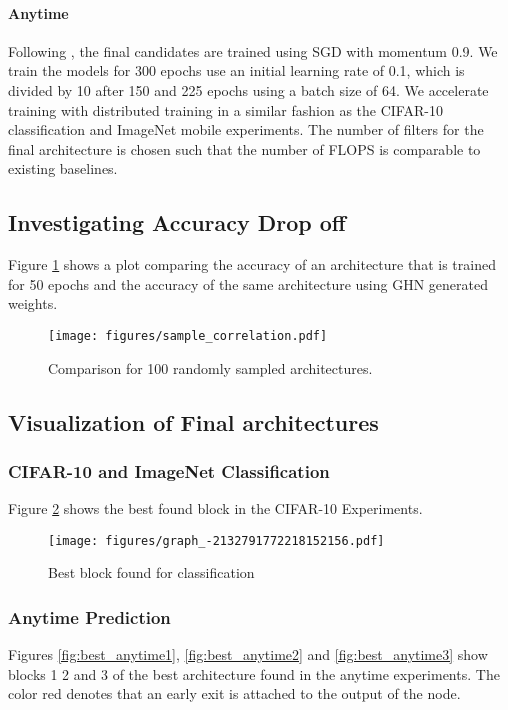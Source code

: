 \documentclass{article} %
\begin{document}
\paragraph{Anytime}Following \cite{huang2017multi}, the final candidates are trained using SGD with momentum 0.9. We train the models for 300 epochs use an initial learning rate of 0.1, which is divided by 10 after 150 and 225 epochs using a batch size of 64. We accelerate training with distributed training in a similar fashion as the CIFAR-10 classification and ImageNet mobile experiments. 
The number of filters for the final architecture is chosen such that the number of FLOPS is comparable to existing baselines.

\subsection{Investigating Accuracy Drop off}
Figure  \ref{fig:sample_correlation} shows a plot comparing the accuracy of an architecture that is trained for 50 epochs and the accuracy of the same architecture using GHN generated weights.
\begin{figure}[h]
\centering
\texttt{[image: figures/sample\_correlation.pdf]}
\caption{Comparison for 100 randomly sampled architectures.}
\label{fig:sample_correlation}
\end{figure}\subsection{Visualization of Final architectures}\subsubsection{CIFAR-10 and ImageNet Classification}
Figure \ref{fig:best_block} shows the best found block in the CIFAR-10 Experiments.

\begin{figure}[h]
\texttt{[image: figures/graph\_-2132791772218152156.pdf]}
\caption{Best block found for classification}
\label{fig:best_block}
\end{figure}\subsubsection{Anytime Prediction}
Figures \ref{fig:best_anytime1}, \ref{fig:best_anytime2} and \ref{fig:best_anytime3} show blocks 1 2 and 3 of the best architecture found in the anytime experiments. The color red denotes that an early exit is attached to the output of the node.
\end{document}
